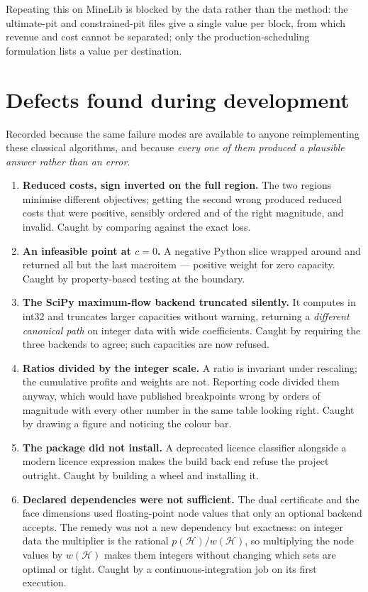 \documentclass[11pt,a4paper]{article}
\begin{document}
Repeating this on MineLib is blocked by the data rather than the method: the
ultimate-pit and constrained-pit files give a single value per block, from
which revenue and cost cannot be separated; only the production-scheduling
formulation lists a value per destination.

\section{Defects found during development}
\label{sec:defects}

Recorded because the same failure modes are available to anyone
reimplementing these classical algorithms, and because \emph{every one of them
produced a plausible answer rather than an error}.

\begin{enumerate}[leftmargin=1.6em]
\item \textbf{Reduced costs, sign inverted on the full region.} The two
regions minimise different objectives; getting the second wrong produced
reduced costs that were positive, sensibly ordered and of the right magnitude,
and invalid. Caught by comparing against the exact loss.

\item \textbf{An infeasible point at $c=0$.} A negative Python slice wrapped
around and returned all but the last macroitem --- positive weight for zero
capacity. Caught by property-based testing at the boundary.

\item \textbf{The SciPy maximum-flow backend truncated silently.} It computes
in int32 and truncates larger capacities without warning, returning a
\emph{different canonical path} on integer data with wide coefficients. Caught
by requiring the three backends to agree; such capacities are now refused.

\item \textbf{Ratios divided by the integer scale.} A ratio is invariant under
rescaling; the cumulative profits and weights are not. Reporting code divided
them anyway, which would have published breakpoints wrong by orders of
magnitude with every other number in the same table looking right. Caught by
drawing a figure and noticing the colour bar.

\item \textbf{The package did not install.} A deprecated licence classifier
alongside a modern licence expression makes the build back end refuse the
project outright. Caught by building a wheel and installing it.

\item \textbf{Declared dependencies were not sufficient.} The dual certificate
and the face dimensions used floating-point node values that only an optional
backend accepts. The remedy was not a new dependency but exactness: on integer
data the multiplier is the rational $p(\mathcal H)/w(\mathcal H)$, so
multiplying the node values by $w(\mathcal H)$ makes them integers without
changing which sets are optimal or tight. Caught by a continuous-integration
job on its first execution.
\end{enumerate}
\end{document}
